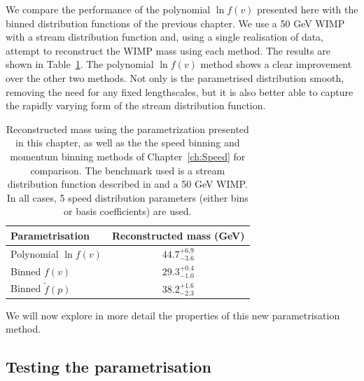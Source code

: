 We compare the performance of the polynomial $\ln f(v)$ presented here with the binned distribution functions of the previous chapter. We use a 50 GeV WIMP with a stream distribution function  and, using a single realisation of data, attempt to reconstruct the WIMP mass using each method. The results are shown in Table~\ref{tab:Poly:ReconstructedMass}. The polynomial $\ln f(v)$ method shows a clear improvement over the other two methods. Not only is the parametrised distribution smooth, removing the need for any fixed lengthscales, but it is also better able to capture the rapidly varying form of the stream distribution function. 

\begin{table}[t]
  \setlength{\extrarowheight}{5pt}
  \begin{center}
	\begin{tabular}{lc}
         \hline\hline
	 Parametrisation & Reconstructed mass (GeV) \\
	 \hline
	 Polynomial $\ln f(v)$ & \(44.7^{+6.9}_{-3.6}\) \\
	 Binned $f(v)$ & \(29.3^{+0.4}_{-1.0}\) \\
	 Binned $\tilde{f}(p)$ & \(38.2^{+1.6}_{-2.3}\)\\
         \hline\hline
	\end{tabular}
  \end{center}
  \caption{Reconstructed mass using the parametrization presented in this chapter, as well as the the speed binning and momentum binning methods of Chapter~\ref{ch:Speed} for comparison. The benchmark used is a stream distribution function described in  and a 50 GeV WIMP. In all cases, 5 speed distribution parameters (either bins or basis coefficients) are used.}
\label{tab:Poly:ReconstructedMass}
\end{table}

We will now explore in more detail the properties of this new parametrisation method.

\subsection{Testing the parametrisation}
\label{sec:Poly:test}

